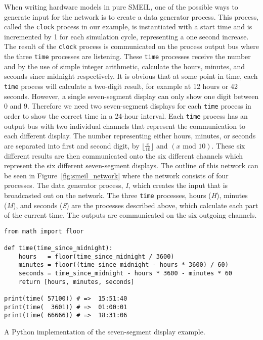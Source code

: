 When writing hardware models in pure SMEIL, one of the possible ways to generate input for the network is to create a data generator process. This process, called the \texttt{clock} process in our example, is instantiated with a start time and is incremented by 1 for each simulation cycle, representing a one second increase. The result of the \texttt{clock} process is communicated on the process output bus where the three \texttt{time} processes are listening. These \texttt{time} processes receive the number and by the use of simple integer arithmetic, calculate the hours, minutes, and seconds since midnight respectively. It is obvious that at some point in time, each \texttt{time} process will calculate a two-digit result, for example at 12 hours or 42 seconds. However, a single seven-segment display can only show one digit between 0 and 9. Therefore we need two seven-segment displays for each \texttt{time} process in order to show the correct time in a 24-hour interval. Each \texttt{time} process has an output bus with two individual channels that represent the communication to each different display. The number representing either hours, minutes, or seconds are separated into first and second digit, by $\lfloor \frac{x}{10} \rfloor$ and $(x \text{ mod } 10)$. These six different results are then communicated onto the six different channels which represent the six different seven-segment displays. The outline of this network can be seen in Figure~\ref{fig:smeil_network} where the network consists of four processes. The data generator process, \textit{I}, which creates the input that is broadcasted out on the network. The three \texttt{time} processes, hours (\textit{H}), minutes (\textit{M}), and seconds (\textit{S}) are the processes described above, which calculate each part of the current time. The outputs are communicated on the six outgoing channels.
\\
\begin{listing}
\begin{verbatim}
from math import floor

def time(time_since_midnight):
    hours   = floor(time_since_midnight / 3600)
    minutes = floor((time_since_midnight - hours * 3600) / 60)
    seconds = time_since_midnight - hours * 3600 - minutes * 60
    return [hours, minutes, seconds]

print(time( 57100)) # =>  15:51:40
print(time(  3601)) # =>  01:00:01
print(time( 66666)) # =>  18:31:06
\end{verbatim}
\caption{A Python implementation of the seven-segment display example.}
\label{lst:python}
\end{listing}
